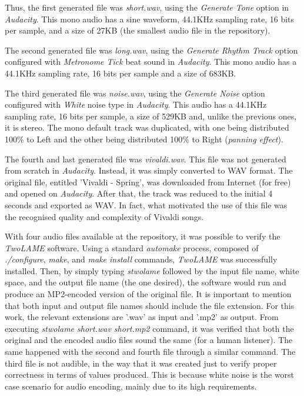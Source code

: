 \documentclass{article}
\begin{document}
Thus, the first generated file was \textit{short.wav}, using the \textit{Generate Tone} option in \textit{Audacity}. This mono audio has a sine waveform, 44.1KHz sampling rate, 16 bits per sample, and a size of 27KB (the smallest audio file in the repository).

The second generated file was \textit{long.wav}, using the \textit{Generate Rhythm Track} option configured with \textit{Metronome Tick} beat sound in \textit{Audacity}. This mono audio has a 44.1KHz sampling rate, 16 bits per sample and a size of 683KB.

The third generated file was \textit{noise.wav}, using the \textit{Generate Noise} option configured with \textit{White} noise type in \textit{Audacity}. This audio has a 44.1KHz sampling rate, 16 bits per sample, a size of 529KB and, unlike the previous ones, it is stereo. The mono default track was duplicated, with one being distributed 100\% to Left and the other being distributed 100\% to Right (\textit{panning effect}).

The fourth and last generated file was \textit{vivaldi.wav}. This file was not generated from scratch in \textit{Audacity}. Instead, it was simply converted to WAV format. The original file, entitled 'Vivaldi - Spring', was downloaded from Internet (for free) and opened on \textit{Audacity}. After that, the track was reduced to the initial 4 seconds and exported as WAV. In fact, what motivated the use of this file was the recognised quality and complexity of Vivaldi songs.

With four audio files available at the repository, it was possible to verify the \textit{TwoLAME} software. Using a standard \textit{automake} process, composed of \textit{./configure}, \textit{make}, and \textit{make install} commands, \textit{TwoLAME} was successfully installed. Then, by simply typing \textit{stwolame} followed by the input file name, white space, and the output file name (the one desired), the software would run and produce an MP2-encoded version of the original file.
It is important to mention that both input and output file names should include the file extension. For this work, the relevant extensions are '.wav' as input and '.mp2' as output.
From executing \textit{stwolame short.wav short.mp2} command, it was verified that both the original and the encoded audio files sound the same (for a human listener). The same happened with the second and fourth file through a similar command. 
The third file is not audible, in the way that it was created just to verify proper correctness in terms of values produced. This is because white noise is the worst case scenario for audio encoding, mainly due to its high requirements. \\
\end{document}

